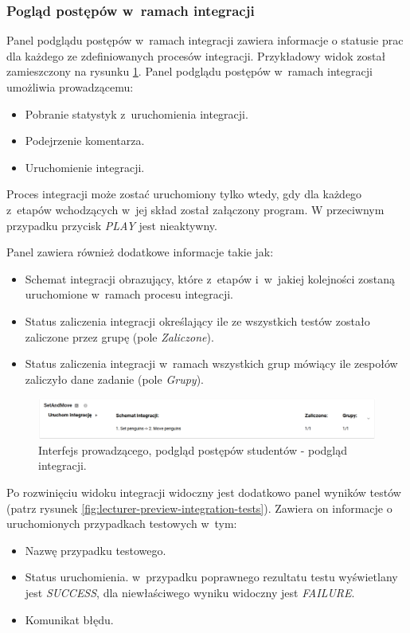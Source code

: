 \subsubsection{Pogląd postępów w~ramach integracji}

Panel podglądu postępów w~ramach integracji zawiera informacje o statusie prac dla każdego ze zdefiniowanych procesów integracji.
Przykładowy widok został zamieszczony na rysunku \ref{fig:lecturer-preview-integration}.
Panel podglądu postępów w~ramach integracji umożliwia prowadzącemu:
\begin {itemize}
    \item Pobranie statystyk z~uruchomienia integracji.
    \item Podejrzenie komentarza.
    \item Uruchomienie integracji.
\end {itemize}
Proces integracji może zostać uruchomiony tylko wtedy, gdy dla każdego z~etapów wchodzących w~jej skład został załączony program.
W przeciwnym przypadku przycisk \textit{PLAY} jest nieaktywny.

Panel zawiera również dodatkowe informacje takie jak:
\begin{itemize}
    \item Schemat integracji obrazujący, które z~etapów i~w~jakiej kolejności zostaną uruchomione w~ramach procesu integracji.
    \item Status zaliczenia integracji określający ile ze wszystkich testów zostało zaliczone przez grupę (pole \textit{Zaliczone}).
    \item Status zaliczenia integracji w~ramach wszystkich grup mówiący ile zespołów zaliczyło dane zadanie (pole \textit{Grupy}).
\end{itemize}

\begin{figure}[h]
    \centering
    \includegraphics[width = 16cm]{chapter04/lecturer_preview_integration.png}
    \caption{Interfejs prowadzącego, podgląd postępów studentów - podgląd integracji.}
    \label{fig:lecturer-preview-integration}
\end{figure}

Po rozwinięciu widoku integracji widoczny jest dodatkowo panel wyników testów (patrz rysunek \ref{fig:lecturer-preview-integration-tests}).
Zawiera on informacje o uruchomionych przypadkach testowych w~tym:
\begin{itemize}
    \item Nazwę przypadku testowego.
    \item Status uruchomienia. w~przypadku poprawnego rezultatu testu wyświetlany jest \textit{SUCCESS}, dla niewłaściwego wyniku widoczny jest \textit{FAILURE}.
    \item Komunikat błędu.
\end{itemize}

